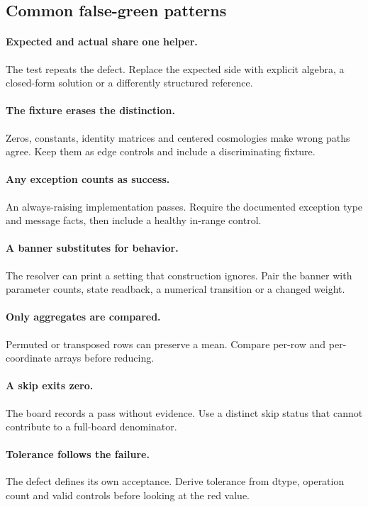 \documentclass[10pt,aps,prd,twocolumn,nofootinbib]{revtex4-2}
\begin{document}
\subsection{Common false-green patterns}

\paragraph{Expected and actual share one helper.}
The test repeats the defect.  Replace the expected side with explicit algebra,
a closed-form solution or a differently structured reference.

\paragraph{The fixture erases the distinction.}
Zeros, constants, identity matrices and centered cosmologies make wrong paths
agree.  Keep them as edge controls and include a discriminating fixture.

\paragraph{Any exception counts as success.}
An always-raising implementation passes.  Require the documented exception
type and message facts, then include a healthy in-range control.

\paragraph{A banner substitutes for behavior.}
The resolver can print a setting that construction ignores.  Pair the banner
with parameter counts, state readback, a numerical transition or a changed
weight.

\paragraph{Only aggregates are compared.}
Permuted or transposed rows can preserve a mean.  Compare per-row and
per-coordinate arrays before reducing.

\paragraph{A skip exits zero.}
The board records a pass without evidence.  Use a distinct skip status that
cannot contribute to a full-board denominator.

\paragraph{Tolerance follows the failure.}
The defect defines its own acceptance.  Derive tolerance from dtype,
operation count and valid controls before looking at the red value.
\end{document}
